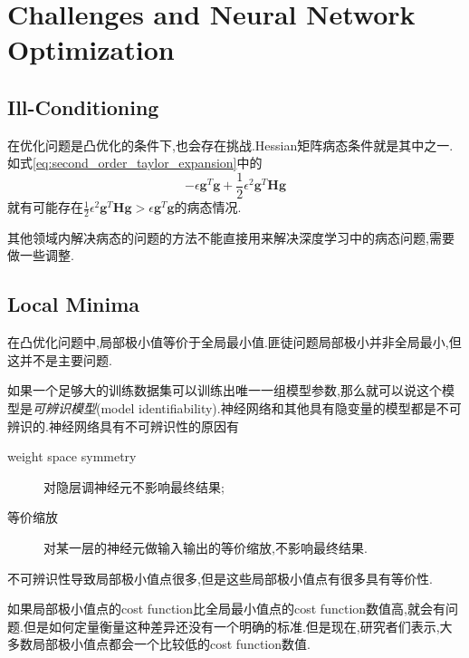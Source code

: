 \section{Challenges and Neural Network Optimization}

\subsection{Ill-Conditioning}

在优化问题是凸优化的条件下,也会存在挑战.Hessian矩阵病态条件就是其中之一.如式\ref{eq:second_order_taylor_expansion}中的
\begin{equation}
-\epsilon\mathbf g^T\mathbf g+\frac{1}{2}\epsilon^2\mathbf g^T\mathbf{Hg}
\end{equation}
就有可能存在$\frac{1}{2}\epsilon^2\mathbf g^T\mathbf{Hg}>\epsilon\mathbf g^T\mathbf g$的病态情况.

其他领域内解决病态的问题的方法不能直接用来解决深度学习中的病态问题,需要做一些调整.

\subsection{Local Minima}

在凸优化问题中,局部极小值等价于全局最小值.匪徒问题局部极小并非全局最小,但这并不是主要问题.

如果一个足够大的训练数据集可以训练出唯一一组模型参数,那么就可以说这个模型是\textit{可辨识模型}(model identifiability).神经网络和其他具有隐变量的模型都是不可辨识的.神经网络具有不可辨识性的原因有
\begin{description}
    \item [weight space symmetry]对隐层调神经元不影响最终结果;
    \item [等价缩放]对某一层的神经元做输入输出的等价缩放,不影响最终结果.
\end{description}

不可辨识性导致局部极小值点很多,但是这些局部极小值点有很多具有等价性.

如果局部极小值点的cost function比全局最小值点的cost function数值高,就会有问题.但是如何定量衡量这种差异还没有一个明确的标准.但是现在,研究者们表示,大多数局部极小值点都会一个比较低的cost function数值.